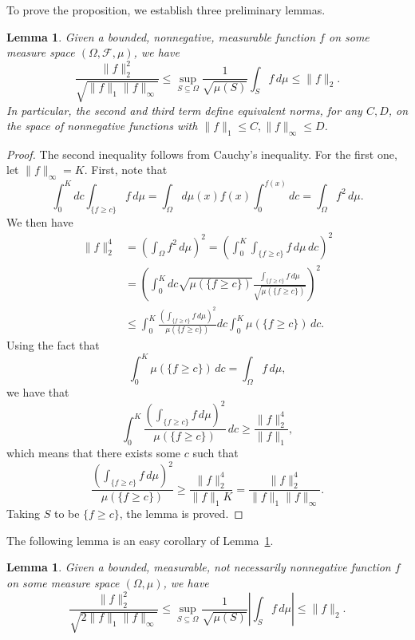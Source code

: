\documentclass{amsart}
\numberwithin{equation}{section}
\numberwithin{figure}{section}
\newtheorem{lemma}[theorem]{Lemma}
\theoremstyle{definition}
\theoremstyle{remark}
\newcommand{\cF}{\mathcal{F}}
\begin{document}
To prove the proposition, we establish three preliminary lemmas.

\begin{lemma}\label{lem:sets2equiv-nonneg}
Given a bounded, nonnegative, measurable function $f$ on some measure space
$(\Omega,\cF,\mu)$, we have
\[\frac{\|f\|_2^2}{\sqrt{\|f\|_1\|f\|_\infty}}\le \sup_{S \subseteq \Omega} \frac{1}{\sqrt{\mu(S)}} \int_{S}f \,d\mu \le \|f\|_2.
\]
In particular, the second and third term define equivalent norms, for any
$C,D$, on the space of nonnegative functions with $\|f\|_1 \le C,\|f\|_\infty
\le D$.
\end{lemma}

\begin{proof}
The second inequality follows from Cauchy's inequality. For the first one,
let $\|f\|_\infty=K$. First, note that
\[\int_0^K d c\int_{\{f \ge c\}}f \,d \mu = \int_{\Omega} d\mu(x)f(x)\int_{0}^{ f(x)} dc =\int_\Omega f^2 \,d \mu.
\]
We then have
\begin{align*}
\|f\|^4_2&=
\left( \int_\Omega f^2 \,d\mu \right)^2
=\left( \int_0^K \int_{\{f \ge c\}}f\,d \mu \,dc \right)^2
\\ &
=\left( \int_0^K dc \sqrt{\mu(\{f\ge c\})}
\frac{\int_{\{f \ge c\}}f\,d \mu }{\sqrt{\mu(\{f\ge c\})}} \right)^2
\\
&\leq
\int_0^K \frac{\left(\int_{\{f \ge c\}}f \,d \mu \right)^2}{\mu(\{f \ge c\})} dc \int_0^K\mu(\{f \ge c\})\,dc
.
\end{align*}
Using the fact that
\[ \int_0^K\mu(\{f \ge c\})\,dc =\int_\Omega f \,d \mu,
\]
we have that
\[\int_0^K \frac{\left(\int_{\{f \ge c\}}f \,d \mu \right)^2}{\mu(\{f \ge c\})} \,dc \ge
\frac{\|f\|_2^4}{\|f\|_1},
\]
which means that there exists some $c$ such that
\[\frac{\left(\int_{\{f \ge c\}}f \,d \mu \right)^2}{\mu(\{f \ge c\})} \ge \frac{\|f\|_2^4}{\|f\|_1K}=\frac{\|f\|_2^4}{\|f\|_1\|f\|_\infty}.
\]
Taking $S$ to be $\{f \ge c\}$, the lemma is proved.
\end{proof}

The following lemma is an easy corollary of Lemma~\ref{lem:sets2equiv-nonneg}.

\begin{lemma} \label{lem:sets2equiv}
Given a bounded, measurable, not necessarily nonnegative function $f$ on some
measure space $(\Omega,\mu)$, we have
\[\frac{\|f\|_2^2}{\sqrt{2\|f\|_1\|f\|_\infty}}\le \sup_{S \subseteq \Omega} \frac{1}{\sqrt{\mu(S)}} \left|\int_{S}f \,d\mu \right| \le \|f\|_2.
\]
\end{lemma}
\end{document}
